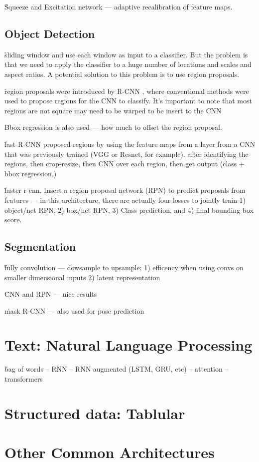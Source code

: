 \r{Squeeze and Excitation network --- adaptive recalibration of feature maps. }



\subsection{Object Detection}

\r{sliding window and use each window as input to a classifier. But the problem is that we need to apply the classifier to a huge number of locations and scales and aspect ratios. A potential solution to this problem is to use region proposals.}

\r{region proposals were introduced by R-CNN , where conventional methods were used to propose regions for the CNN to classify. It's important to note that most regions are not square may need to be warped to be insert to the CNN}

\r{Bbox regression is also used --- how much to offset the region proposal.}


\r{fast R-CNN proposed regions by using the feature maps from a layer from a CNN that was previously trained (VGG or Resnet, for example). after identifying the regions, then crop-resize, then CNN over each region, then get output (class + bbox regression.)}

\r{faster r-cnn. Insert a region proposal network (RPN) to predict proposals from features --- in this architecture, there are actually four losses to jointly train 1) object/net RPN, 2) box/net RPN, 3) Class prediction, and 4) final bounding box score.}


\subsection{Segmentation}

\r{fully convolution --- dowsample to upsample: 1) efficency when using convs on smaller dimensional inputs 2) latent representation}

\r{CNN and RPN --- nice results }

\r{mask R-CNN --- also used for pose prediction}



\section{Text: Natural Language Processing}

\r{bag of words -- RNN -- RNN augmented (LSTM, GRU, etc) -- attention -- transformers }


\section{Structured data: Tablular}


\section{Other Common Architectures}

